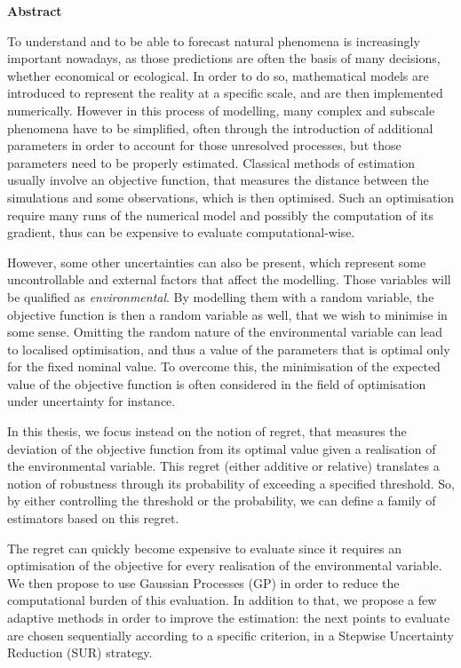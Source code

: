 \documentclass[12pt, a4paper]{article}
\begin{document}
\pagestyle{empty}
\scriptsize
\vfill
\begin{center}
 \small \bf Abstract
\end{center}
\vspace{0.3cm}

To understand and to be able to forecast natural phenomena is
increasingly important nowadays, as those predictions are often the
basis of many decisions, whether economical or ecological. In order to
do so, mathematical models are introduced to represent the reality at
a specific scale, and are then implemented numerically. However in
this process of modelling, many complex and subscale phenomena have to
be simplified, often through the introduction of additional parameters
in order to account for those unresolved processes, but those
parameters need to be properly estimated. Classical methods of
estimation usually involve an objective function, that measures the
distance between the simulations and some observations, which is then
optimised. Such an optimisation require many runs of the numerical
model and possibly the computation of its gradient, thus can be
expensive to evaluate computational-wise.

However, some other uncertainties can also be present, which represent
some uncontrollable and external factors that affect the
modelling. Those variables will be qualified as
\emph{environmental}. By modelling them with a random variable, the
objective function is then a random variable as well, that we wish to
minimise in some sense. Omitting the random nature of the
environmental variable can lead to localised optimisation, and thus a
value of the parameters that is optimal only for the fixed nominal
value.  To overcome this, the minimisation of the expected value of
the objective function is often considered in the field of
optimisation under uncertainty for instance.

In this thesis, we focus instead on the notion of regret, that
measures the deviation of the objective function from its optimal
value given a realisation of the environmental variable. This regret
(either additive or relative) translates a notion of robustness
through its probability of exceeding a specified threshold. So, by
either controlling the threshold or the probability, we can define a
family of estimators based on this regret.

The regret can quickly become expensive to evaluate since it requires
an optimisation of the objective for every realisation of the
environmental variable. We then propose to use Gaussian Processes (GP)
in order to reduce the computational burden of this evaluation. In
addition to that, we propose a few adaptive methods in order to
improve the estimation: the next points to evaluate are chosen
sequentially according to a specific criterion, in a Stepwise
Uncertainty Reduction (SUR) strategy.
\end{document}
